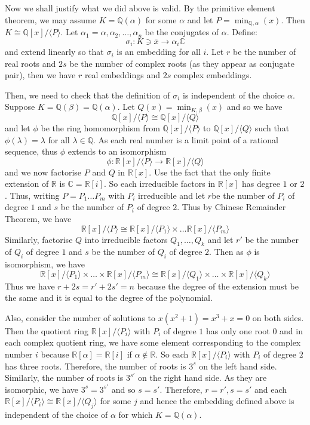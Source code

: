 Now we shall justify what we did above is valid. By the primitive element theorem, we may assume $K=\mathbb{Q}(\alpha)$ for some $\alpha$ and let $P=\min_{\mathbb{Q},\alpha}(x)$. Then $K \cong \mathbb{Q}[x]/\langle P \rangle$. Let $\alpha_1=\alpha, \alpha_2,\ldots, \alpha_n$ be the conjugates of $\alpha$. Define:
$$\sigma_i: K \ni \bar{x} \rightarrow \alpha_i \mathbb{C}$$
and extend linearly so that $\sigma_i$ is an embedding for all $i$. Let $r$ be the number of real roots and $2s$ be the number of complex roots (as they appear as conjugate pair), then we have $r$ real embeddings and $2s$ complex embeddings.

Then, we need to check that the definition of $\sigma_i$ is independent of the choice $\alpha$.
Suppose $K=\mathbb{Q}(\beta)=\mathbb{Q}(\alpha)$. Let $Q(x)=\min_{K,\beta}(x)$ and so we have
$$\mathbb{Q}[x]/\langle P \rangle \cong \mathbb{Q}[x]/\langle Q \rangle$$
and let $\phi$ be the ring homomorphism from  $\mathbb{Q}[x]/\langle P \rangle$ to $\mathbb{Q}[x]/\langle Q \rangle$ such that $\phi(\lambda)=\lambda$ for all $\lambda \in \mathbb{Q}$.
As each real number is a limit point of a rational sequence, thus $\phi$ extends to an isomorphism
$$\phi: \mathbb{R}[x]/\langle P \rangle \rightarrow \mathbb{R}[x]/\langle Q \rangle$$
and we now factorise $P$ and $Q$ in $\mathbb{R}[x]$.
Use the fact that the only finite extension of $\mathbb{R}$ is $\mathbb{C}=\mathbb{R}[i]$. So each irreducible factors in $\mathbb{R}[x]$ has degree $1$ or $2$. Thus, writing $P=P_1\ldots P_m$ with $P_i$ irreducible and let $r$be the number of $P_i$ of degree $1$ and $s$ be the number of $P_i$ of degree $2$.
Thus by Chinese Remainder Theorem, we have
$$\mathbb{R}[x]/\langle P \rangle \cong \mathbb{R}[x]/\langle P_1 \rangle \times \ldots \mathbb{R}[x]/\langle P_m \rangle$$
Similarly, factorise $Q$ into irreducible factors $Q_1,\ldots,Q_k$ and let $r'$ be the number of $Q_i$ of degree $1$ and $s$ be the number of $Q_i$ of degree $2$. Then as $\phi$ is isomorphism, we have
$$\mathbb{R}[x]/\langle P_1\rangle \times \ldots \times \mathbb{R}[x]/\langle P_m \rangle
\cong \mathbb{R}[x]/\langle Q_1 \rangle \times \ldots \times \mathbb{R}[x]/\langle Q_k \rangle$$
Thus we have $r+2s=r'+2s'=n$ because the degree of the extension must be the same and it is equal to the degree of the polynomial.

Also, consider the number of solutions to $x(x^2+1)=x^3+x=0$ on both sides. Then the quotient ring
$\mathbb{R}[x]/\langle P_i \rangle$ with $P_i$ of degree $1$ has only one root $0$ and in each complex quotient ring, we have some element corresponding to the complex number $i$ because $\mathbb{R}[\alpha]=\mathbb{R}[i]$ if $\alpha \not \in \mathbb{R}$. So each $\mathbb{R}[x]/\langle P_i \rangle$ with $P_i$ of degree $2$ has three roots. Therefore, the number of roots is $3^s$ on the left hand side. Similarly, the number of roots is $3^{s'}$ on the right hand side. As they are isomorphic, we have $3^s=3^{s'}$ and so $s=s'$. Therefore, $r=r', s=s'$ and each
$\mathbb{R}[x]/\langle P_i \rangle \cong \mathbb{R}[x]/\langle Q_j \rangle$ for some $j$ and hence the embedding defined above is independent of the choice of $\alpha$ for which $K=\mathbb{Q}(\alpha)$.

